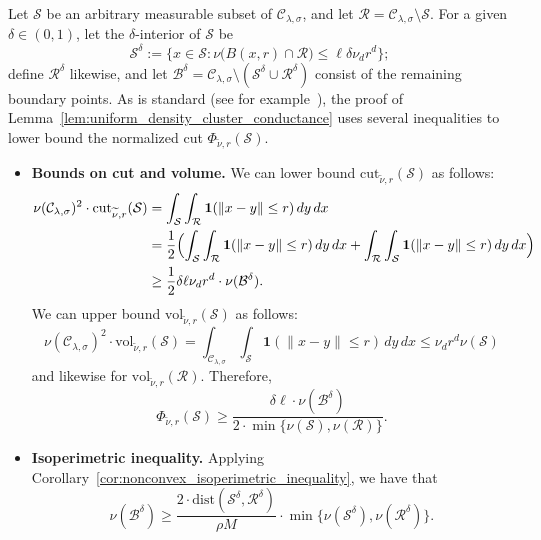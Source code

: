 \documentclass[twoside,11pt]{article}
\newcommand{\1}{\mathbf{1}}
\newcommand{\mc}[1]{\mathcal{#1}}
\newcommand{\wt}[1]{\widetilde{#1}}
\newcommand{\vol}{\mathrm{vol}}
\newcommand{\cut}{\mathrm{cut}}
\begin{document}
Let $\mc{S}$ be an arbitrary measurable subset of $\mc{C}_{\lambda,\sigma}$, and let $\mc{R} = \mc{C}_{\lambda,\sigma} \setminus \mc{S}$. For a given $\delta \in (0,1)$, let the $\delta$-interior of $\mc{S}$ be 
\begin{equation*}
\mc{S}^{\delta} := \{x \in \mc{S}: \nu\bigl(B(x,r) \cap \mc{R}\bigr) \leq \ell \delta \nu_d r^d\};
\end{equation*}
define $\mc{R}^{\delta}$ likewise, and let $\mc{B}^{\delta} = \mc{C}_{\lambda,\sigma} \setminus (\mc{S}^{\delta} \cup \mc{R}^{\delta})$ consist of the remaining boundary points.
As is standard (see for example~\cite{dyer1991b,lovasz1990}), the proof of Lemma~\ref{lem:uniform_density_cluster_conductance} uses several inequalities to lower bound the normalized cut $\Phi_{\wt{\nu},r}(\mc{S})$.
\begin{itemize}
	\item \textbf{Bounds on cut and volume.}
	We can lower bound $\cut_{\wt{\nu},r}(\mc{S})$ as follows:
	\begin{align*}
	\nu(\mc{C}_{\lambda,\sigma})^2 \cdot \cut_{\wt{\nu},r}(\mc{S}) & = \int_{\mc{S}} \int_{\mc{R}} \1(\|x - y\| \leq r) \,dy \,dx \\
	& = \frac{1}{2}\Bigl(\int_{\mc{S}} \int_{\mc{R}} \1(\|x - y\| \leq r) \,dy \,dx + \int_{\mc{R}} \int_{\mc{S}} \1(\|x - y\| \leq r) \,dy \,dx\Bigr) \\
	& \geq \frac{1}{2} \delta \ell \nu_d r^d \cdot \nu(\mc{B}^{\delta}).
	\end{align*}
	We can upper bound $\vol_{\wt{\nu},r}(\mc{S})$ as follows:
	\begin{equation*}
	\nu(\mc{C}_{\lambda,\sigma})^2 \cdot \vol_{\wt{\nu},r}(\mc{S}) = \int_{\mc{C}_{\lambda,\sigma}} \int_{\mc{S}} \1(\|x - y\| \leq r) \,dy \,dx \leq \nu_d r^d \nu(\mc{S})
	\end{equation*}
	and likewise for $\vol_{\wt{\nu},r}(\mc{R})$. Therefore,
	\begin{equation}
	\label{pf:uniform_density_cluster_conductance_1}
	\Phi_{\wt{\nu},r}(\mc{S}) \geq \frac{\delta \ell \cdot \nu(\mc{B}^{\delta})}{2 \cdot \min\{\nu(\mc{S}), \nu(\mc{R})\}}.
	\end{equation}
	\item \textbf{Isoperimetric inequality.}
	Applying Corollary~\ref{cor:nonconvex_isoperimetric_inequality}, we have that
	\begin{equation}
	\label{pf:uniform_density_cluster_conductance_2}
	\nu(\mc{B}^{\delta}) \geq \frac{2 \cdot \mathrm{dist}(\mc{S}^{\delta},\mc{R}^{\delta})}{\rho M} \cdot \min\bigl\{\nu(\mc{S}^{\delta}),\nu(\mc{R}^{\delta})\bigr\}.

\end{equation}
\end{itemize}
\end{document}
